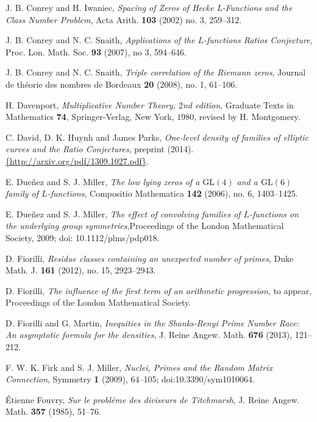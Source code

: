 \documentclass[12pt,reqno]{amsart}
\numberwithin{equation}{section}
\theoremstyle{plain}
\begin{document}
\begin{thebibliography}{GJMMNPPV}
\newblock J. B. Conrey and H. Iwaniec, \emph{Spacing of Zeros of Hecke L-Functions and the Class Number Problem}, Acta Arith. \textbf{103} (2002) no. 3, 259--312.

\newblock J. B. Conrey and N. C. Snaith, \emph{Applications of the
$L$-functions Ratios Conjecture},  Proc. Lon. Math. Soc. \textbf{93} (2007), no 3, 594--646.

\newblock J. B. Conrey and N. C. Snaith, \emph{Triple correlation of
the Riemann zeros}, Journal de th\'eorie des nombres de Bordeaux \textbf{20} (2008), no. 1, 61--106.

\newblock H. Davenport, \emph{Multiplicative Number Theory, $2$nd edition},
Graduate Texts in Mathematics \textbf{74}, Springer-Verlag, New York,
$1980$, revised by H. Montgomery.

C. David, D. K. Huynh and James Parks, \emph{One-level density of families of elliptic curves and the Ratio Conjectures}, preprint (2014). {\textcolor{blue}{\url{{http://arxiv.org/pdf/1309.1027.pdf}}}}.

\newblock E. Due\~nez and S. J. Miller, \emph{The low lying zeros of a
$\text{GL}(4)$ and a $\text{GL}(6)$ family of $L$-functions},
Compositio Mathematica \textbf{142} (2006), no. 6, 1403--1425.

\newblock E. Due\~nez and S. J. Miller, \emph{The effect of
convolving families of $L$-functions on the underlying group
symmetries},Proceedings of the London Mathematical Society, 2009; doi: 10.1112/plms/pdp018.

 D. Fiorilli, \emph{Residue classes containing an unexpected number of primes}, Duke Math. J. \textbf{161} (2012), no. 15, 2923--2943.

 D. Fiorilli, \emph{The influence of the first term of an arithmetic progression}, to appear, Proceedings of the London Mathematical Society.

 D. Fiorilli and G. Martin, \emph{Inequities in the Shanks-Renyi Prime Number Race: An asymptotic formula for the densities}, J. Reine Angew. Math. \textbf{676} (2013), 121--212.

F. W. K. Firk and S. J. Miller, \emph{Nuclei, Primes and the Random Matrix Connection}, Symmetry \textbf{1} (2009), 64--105; doi:10.3390/sym1010064.

 \'Etienne Fouvry, \emph{Sur le probl\'eme des diviseurs de Titchmarsh}, J. Reine Angew. Math. \textbf{357} (1985), 51--76.


\end{thebibliography}
\end{document}
